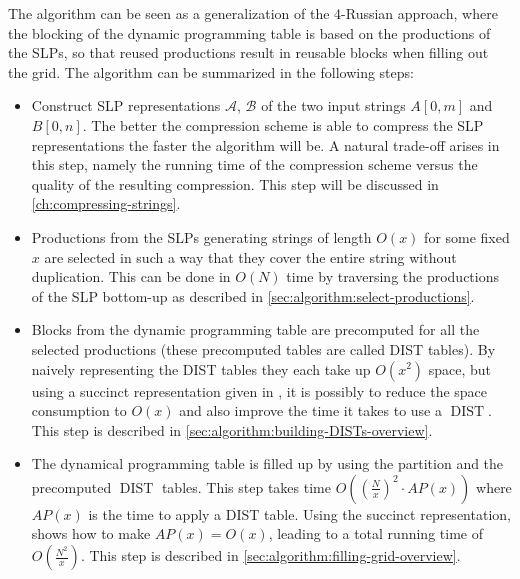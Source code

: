 \documentclass[twoside,11pt,openright]{report}
\newcommand{\DIST}{\operatorname{DIST}}
\newcommand{\str}[3]{#1[#2, #3]}
\newcommand{\SLP}[1] {\mathcal{#1}}
\begin{document}
The algorithm can be seen as a generalization of the 4-Russian approach, where the blocking of the dynamic programming table is based on the productions of the SLPs, so that reused productions result in reusable blocks when filling out the grid. The algorithm can be summarized in the following steps:
\begin{itemize}
  \item Construct SLP representations $\SLP{A}$, $\SLP{B}$ of the two input strings $\str{A}{0}{m}$ and $\str{B}{0}{n}$. The better the compression scheme is able to compress the SLP representations the faster the algorithm will be. A natural trade-off arises in this step, namely the running time of the compression scheme versus the quality of the resulting compression. This step will be discussed in \cref{ch:compressing-strings}.
  \item Productions from the SLPs generating strings of length $O(x)$ for some fixed $x$ are selected in such a way that they cover the entire string without duplication. This can be done in $O(N)$ time by traversing the productions of the SLP bottom-up as described in \cref{sec:algorithm:select-productions}.
  \item Blocks from the dynamic programming table are precomputed for all the selected productions (these precomputed tables are called DIST tables). By naively representing the DIST tables they each take up $O(x^2)$ space, but using a succinct representation given in \cite{DBLP:journals/corr/abs-0707-3619}, it is possibly to reduce the space consumption to $O(x)$ and also improve the time it takes to use a $\DIST$. This step is described in \cref{sec:algorithm:building-DISTs-overview}.
  \item The dynamical programming table is filled up by using the partition and the precomputed $\DIST$ tables. This step takes time $O\left(\left(\frac{N}{x}\right)^2 \cdot AP(x)\right)$ where $AP(x)$ is the time to apply a DIST table. Using the succinct representation, \cite{Gawrychowski:2012:FAC:2422024.2422048} shows how to make $AP(x) = O(x)$, leading to a total running time of $O(\frac{N^2}{x})$. This step is described in \cref{sec:algorithm:filling-grid-overview}.
\end{itemize}
\end{document}
